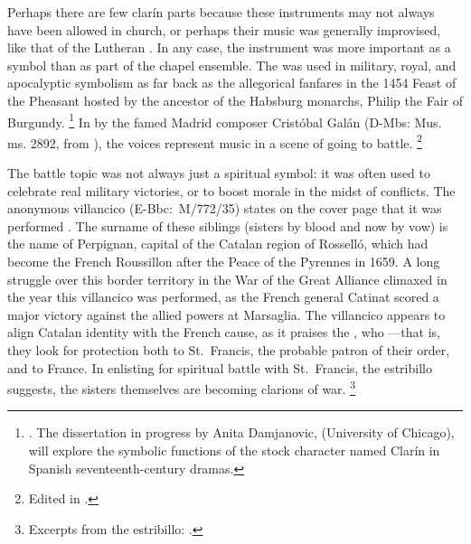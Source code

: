 Perhaps there are few clarín parts because these instruments may not always have been allowed in church, or perhaps their music was generally improvised, like that of the Lutheran .
In any case, the instrument was more important as a symbol than as part of the chapel ensemble.
The  was used in military, royal, and apocalyptic symbolism as far back as the allegorical  fanfares in the 1454 Feast of the Pheasant hosted by the ancestor of the Habsburg monarchs, Philip the Fair of Burgundy.%
	\footnote{%
	\autocites[340--380]{LaMarche:Memoires}{Bloxam:JNV}{Perkins:Patronage15C}.
The dissertation in progress by Anita Damjanovic,  (University of Chicago), will explore the symbolic functions of the stock character named Clarín in Spanish seventeenth-century dramas.
	}
In  by the famed Madrid composer Cristóbal Galán (D-Mbs: Mus. ms. 2892, from ), the voices represent  music in a scene of  going to battle.%
	\footnote{%
	Edited in \autocite[555--565]{CaberoPueyo:PhD}.
	}

The battle topic was not always just a spiritual symbol: it was often used to celebrate real military victories, or to boost morale in the midst of conflicts.
The anonymous villancico  (E-Bbc:~M/772/35) states on the cover page that it was performed .
The surname of these siblings (sisters by blood and now by vow) is the name of Perpignan, capital of the Catalan region of Rosselló, which had become the French Roussillon after the Peace of the Pyrennes in 1659.
A long struggle over this border territory in the War of the Great Alliance climaxed in the year this villancico was performed, as the French general Catinat scored a major victory against the allied powers at Marsaglia. %
The villancico appears to align Catalan identity with the French cause, as it praises the , who ---that is, they look for protection both to St.~Francis, the probable patron of their order, and to France.
In enlisting for spiritual battle with St.~Francis, the estribillo suggests, the sisters themselves are becoming clarions of war.%
	\footnote{%
	Excerpts from the estribillo: .
	}

